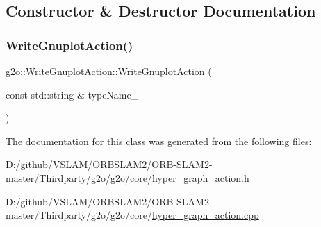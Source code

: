 \subsection{Constructor \& Destructor Documentation}
\mbox{\label{classg2o_1_1_write_gnuplot_action_abfae045b16ae760f6d0c7feefe4b751f}} 
\subsubsection{\texorpdfstring{Write\+Gnuplot\+Action()}{WriteGnuplotAction()}}
{\footnotesize\ttfamily g2o\+::\+Write\+Gnuplot\+Action\+::\+Write\+Gnuplot\+Action (\begin{DoxyParamCaption}\item[{const std\+::string \&}]{type\+Name\+\_\+ }\end{DoxyParamCaption})}



The documentation for this class was generated from the following files\+:\begin{DoxyCompactItemize}
\item 
D\+:/github/\+V\+S\+L\+A\+M/\+O\+R\+B\+S\+L\+A\+M2/\+O\+R\+B-\/\+S\+L\+A\+M2-\/master/\+Thirdparty/g2o/g2o/core/\mbox{\hyperlink{hyper__graph__action_8h}{hyper\+\_\+graph\+\_\+action.\+h}}\item 
D\+:/github/\+V\+S\+L\+A\+M/\+O\+R\+B\+S\+L\+A\+M2/\+O\+R\+B-\/\+S\+L\+A\+M2-\/master/\+Thirdparty/g2o/g2o/core/\mbox{\hyperlink{hyper__graph__action_8cpp}{hyper\+\_\+graph\+\_\+action.\+cpp}}\end{DoxyCompactItemize}
